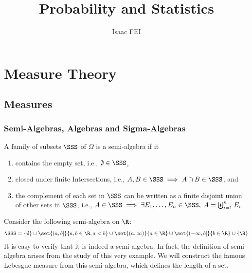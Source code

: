 \documentclass[thmcnt=section, 12pt]{elegantbook}
\title{Probability and Statistics}
\author{Isaac FEI}
\begin{document}
\maketitle

\frontmatter
\tableofcontents
\mainmatter



\part{Measure Theory}





\chapter{Measures}


\section{Semi-Algebras, Algebras and Sigma-Algebras}


\begin{definition}
    A family of subsets $\SSS$ of $\Omega$ is a semi-algebra if it
    \begin{enumerate}
        \item contains the empty set, i.e., $\emptyset \in \SSS $, 
        \item closed under finite Intersections, i.e., $A, B \in \SSS \implies A \cap B \in \SSS$, and 
        \item the complement of each set in $\SSS$ can be written as a finite disjoint union of other sets in $\SSS$, i.e., $A \in \SSS \implies \exists E_1, \ldots, E_n \in  \SSS, \; A = \biguplus_{i=1}^n E_i$.
    \end{enumerate}
\end{definition}

\begin{example} \label{eg:1}
    Consider the following semi-algebra on $\R$:
    \begin{align*}
        \SSS = \left\{\emptyset\right\}
        \cup \set{(a, b]}{a, b \in \R, a < b}
        \cup \set{(a, \infty)}{a \in \R}
        \cup \set{(-\infty, b]}{b \in \R}
        \cup \left\{\R\right\}
    \end{align*}
    It is easy to verify that it is indeed a semi-algebra. In fact, the definition of semi-algebra arises from the study of this very example. We will construct the famous Lebesgue measure from this semi-algebra, which defines the length of a set.
\end{example}
\end{document}
